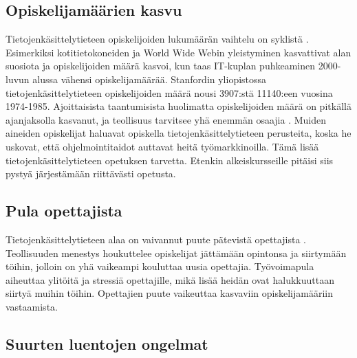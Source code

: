 \documentclass[finnish]{tktltiki2}
\theoremstyle{definition}
\theoremstyle{remark}
\begin{document}
\subsection{Opiskelijamäärien kasvu}
Tietojenkäsittelytieteen opiskelijoiden lukumäärän vaihtelu on syklistä \cite{Roberts11}. Esimerkiksi kotitietokoneiden ja World Wide Webin yleistyminen kasvattivat alan suosiota ja opiskelijoiden määrä kasvoi, kun taas IT-kuplan puhkeaminen 2000-luvun alussa vähensi opiskelijamäärää. Stanfordin yliopistossa tietojenkäsittelytieteen opiskelijoiden määrä nousi 3907:stä 11140:een vuosina 1974-1985\cite{Reges 88}. Ajoittaisista taantumisista huolimatta opiskelijoiden määrä on pitkällä ajanjaksolla kasvanut, ja teollisuus tarvitsee yhä enemmän osaajia \cite{Roberts11}. Muiden aineiden opiskelijat haluavat opiskella tietojenkäsittelytieteen perusteita, koska he uskovat, että ohjelmointitaidot auttavat heitä työmarkkinoilla. Tämä lisää tietojenkäsittelytieteen opetuksen tarvetta. Etenkin alkeiskursseille pitäisi siis pystyä järjestämään riittävästi opetusta. 

\subsection{Pula opettajista}
Tietojenkäsittelytieteen alaa on vaivannut puute pätevistä opettajista \cite{Roberts99}. Teollisuuden menestys houkuttelee opiskelijat jättämään opintonsa ja siirtymään töihin, jolloin on yhä vaikeampi kouluttaa uusia opettajia. Työ\-voi\-ma\-pu\-la aiheuttaa ylitöitä ja stressiä opettajille, mikä lisää heidän ovat halukkuuttaan siirtyä muihin töihin. Opettajien puute vaikeuttaa kasvaviin opiskelijamääriin vastaamista.

\subsection{Suurten luentojen ongelmat}
\end{document}
